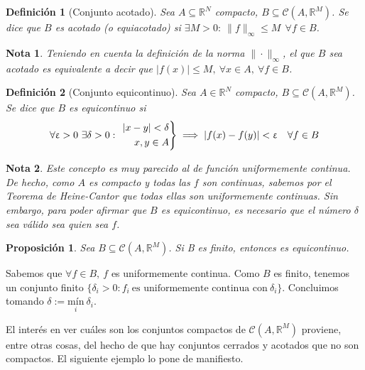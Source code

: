 \documentclass[11pt, a4paper]{article}
\makeatletter
\newif\IfInSansMode
\let\oldsf\sffamily
\renewcommand*{\sffamily}{\oldsf\mathversion{sans}\InSansModetrue}
\let\oldnorm\normalfont
\renewcommand*{\normalfont}{\oldnorm\InSansModefalse\mathversion{normal}}
\let\epsilon\upvarepsilon
\renewenvironment{proof}[1][\proofname] {\par\pushQED{\qed}\normalfont\topsep6\p@\@plus6\p@\relax\trivlist\item[\hskip\labelsep\itshape\sffamily#1\@addpunct{.}]\ignorespaces}{\popQED\endtrivlist\@endpefalse}
\theoremstyle{theorem-style}
\newtheorem{nprop}{Proposición}[section]
\theoremstyle{definition-style}
\newtheorem{ndef}{Definición}[section]
\theoremstyle{remark-style}
\newtheorem*{nota}{Nota}
\theoremstyle{example-style}
\newenvironment{rcases}
{\left.\begin{aligned}}
    {\end{aligned}\right\rbrace}
\makeatother
\begin{document}
\begin{ndef}[Conjunto acotado]
  Sea $A \subseteq \mathbb{R}^N$ compacto, $B \subseteq \mathcal{C}(A,\mathbb{R}^M)$. Se dice que $B$ es acotado (o equiacotado) si $\exists M > 0: \ \|f\|_{\infty} \le M \ \ \forall f \in B$.
\end{ndef}

\begin{nota}
  Teniendo en cuenta la definición de la norma $\|\cdot\|_\infty$, el que $B$ sea acotado es equivalente a decir que $|f(x)|\le M,\ \forall x \in A,\ \forall f \in B$.
\end{nota}

\begin{ndef}[Conjunto equicontinuo]
  Sea $A \in \mathbb{R}^N$ compacto, $B \subseteq \mathcal{C}(A,\mathbb{R}^M)$. Se dice que $B$ es equicontinuo si $$\forall \epsilon > 0\ \exists \delta > 0:\ \begin{rcases} |x-y| < \delta\\ x,y \in A \end{rcases} \implies |f(x) - f(y)| < \epsilon \quad \forall f \in B$$
\end{ndef}

\begin{nota}
  Este concepto es muy parecido al de función uniformemente continua. De hecho, como $A$ es compacto y todas las $f$ son continuas, sabemos por el \textit{Teorema de Heine-Cantor} que todas ellas son uniformemente continuas. Sin embargo, para poder afirmar que $B$ es equicontinuo, es necesario que el número $\delta$ sea válido sea quien sea $f$. 
\end{nota}

\begin{nprop} Sea $B \subseteq \mathcal{C}(A,\mathbb{R}^M)$. Si B es finito, entonces es equicontinuo.
\end{nprop}

  \begin{proof}
    Sabemos que $\forall f \in B,\ f$ es uniformemente continua. Como $B$ es finito, tenemos un conjunto finito $\{\delta_i > 0 : f_i \ \text{es uniformemente continua con} \ \delta_i\}$. Concluimos tomando $\delta := \underset{i}{\text{mín}} \ \delta_i$.
  \end{proof}

El interés en ver cuáles son los conjuntos compactos de $\mathcal{C}(A,\mathbb{R}^M)$ proviene, entre otras cosas, del hecho de que hay conjuntos cerrados y acotados que no son compactos. El siguiente ejemplo lo pone de manifiesto.
\end{document}
